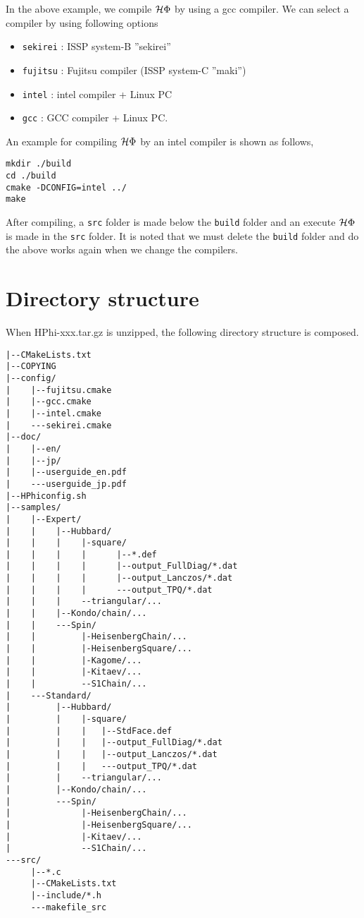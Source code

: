 In the above example, we compile $\mathcal{H} \Phi$ by using a gcc compiler. We can select a compiler by using following options
\begin{itemize}
\item \verb|sekirei| : ISSP system-B ''sekirei''
\item \verb|fujitsu| : Fujitsu compiler (ISSP system-C ''maki'')
\item \verb|intel| : intel compiler + Linux PC
\item \verb|gcc| : GCC compiler + Linux PC.
\end{itemize}
An example for compiling $\mathcal{H} \Phi$ by an intel compiler is shown as follows, 
\begin{verbatim}
mkdir ./build
cd ./build
cmake -DCONFIG=intel ../
make
\end{verbatim}
After compiling,  a \verb|src| folder is made below the \verb|build| folder and an execute $\mathcal{H} \Phi$ is made in the  \verb|src| folder. It is noted that  we must delete the  \verb|build| folder and do the above works again when we change the compilers.

\label{Sec:HowToInstall}

\section{Directory structure}
When HPhi-xxx.tar.gz is unzipped, the following directory structure is composed.
 
\begin{verbatim}
|--CMakeLists.txt
|--COPYING
|--config/
|    |--fujitsu.cmake
|    |--gcc.cmake
|    |--intel.cmake
|    ---sekirei.cmake
|--doc/
|    |--en/
|    |--jp/
|    |--userguide_en.pdf
|    ---userguide_jp.pdf
|--HPhiconfig.sh
|--samples/
|    |--Expert/
|    |    |--Hubbard/
|    |    |    |-square/
|    |    |    |      |--*.def
|    |    |    |      |--output_FullDiag/*.dat
|    |    |    |      |--output_Lanczos/*.dat
|    |    |    |      ---output_TPQ/*.dat
|    |    |    --triangular/...
|    |    |--Kondo/chain/...
|    |    ---Spin/
|    |         |-HeisenbergChain/...
|    |         |-HeisenbergSquare/...
|    |         |-Kagome/...
|    |         |-Kitaev/...
|    |         --S1Chain/...
|    ---Standard/
|         |--Hubbard/
|         |    |-square/
|         |    |   |--StdFace.def
|         |    |   |--output_FullDiag/*.dat
|         |    |   |--output_Lanczos/*.dat
|         |    |   ---output_TPQ/*.dat
|         |    --triangular/...
|         |--Kondo/chain/...
|         ---Spin/
|              |-HeisenbergChain/...
|              |-HeisenbergSquare/...
|              |-Kitaev/...
|              --S1Chain/...
---src/
     |--*.c
     |--CMakeLists.txt
     |--include/*.h
     ---makefile_src
\end{verbatim}

